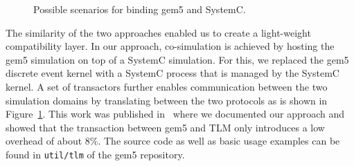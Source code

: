 \begin{figure}
    \centering
    \caption{Possible scenarios for binding gem5 and SystemC.}
    \label{fig:gem5_tlm_example}
\end{figure}

The similarity of the two approaches enabled us to create a light-weight
compatibility layer. In our approach, co-simulation is achieved by hosting the
gem5 simulation on top of a SystemC simulation. For this, we replaced the gem5
discrete event kernel with a SystemC process that is managed by the SystemC
kernel. A set of transactors further enables communication between the two
simulation domains by translating between the two protocols as is shown in
Figure~\ref{fig:gem5_tlm_example}. This work was published
in~\cite{menard2017-system-systemc} where we documented our approach and showed
that the transaction between gem5 and TLM only introduces a low overhead of
about \(8\%\). The source code as well as basic usage examples can be found in
\texttt{util/tlm} of the gem5 repository.

